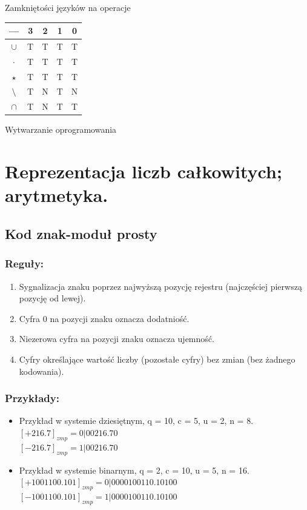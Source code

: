 \documentclass[12pt]{article}
\begin{document}
    Zamkniętości języków na operacje
    \begin{center}
        \begin{tabular}{||c c c c c||}
            \hline
            --- & 3 & 2 & 1 & 0 \\ [0.5ex]
            \hline\hline
            $\cup$ & T & T & T & T \\
            \hline
            $\cdot$ & T & T & T & T \\
            \hline
            $\star$ & T & T & T & T \\
            \hline
            $\setminus$ & T & N & T & N \\
            \hline
            $\cap $ & T & N & T & T \\ [1ex]
            \hline
        \end{tabular}
    \end{center}

    \newpage

    {\Large Wytwarzanie oprogramowania}

    \section{Reprezentacja liczb całkowitych; arytmetyka.}

    \subsection{Kod znak-moduł prosty}
    \subsubsection{Reguły:}
    \begin{enumerate}
        \item Sygnalizacja znaku poprzez najwyższą pozycję
        rejestru (najczęściej pierwszą pozycję od lewej).
        \item Cyfra 0 na pozycji znaku oznacza dodatniość.
        \item Niezerowa cyfra na pozycji znaku oznacza ujemność.
        \item Cyfry określające wartość liczby (pozostałe cyfry) bez zmian (bez żadnego kodowania).
    \end{enumerate}
    \subsubsection{Przykłady:}
    \begin{itemize}
        \item Przykład w systemie dziesiętnym, q = 10,
        c = 5, u = 2, n = 8.\\
        $[+216.7]_{zmp} = 0|00216.70$\\
        $[-216.7]_{zmp} = 1|00216.70$
        \item Przykład w systemie binarnym, q = 2, c = 10,
        u = 5, n = 16.\\
        $[+1001100.101]_{zmp} = 0|0000100110.10100$\\
        $[-1001100.101]_{zmp} = 1|0000100110.10100$
    \end{itemize}
\end{document}
